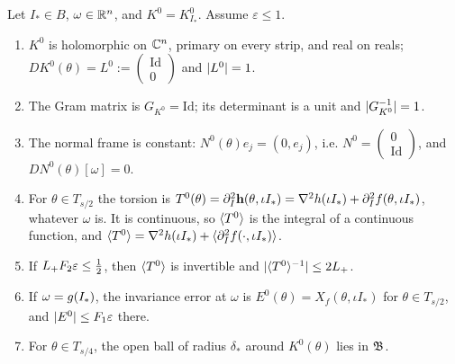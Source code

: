 \begin{lemma}\label{bp:p4:unperturbed}
Let $I_*\in B$, $\omega\in\mathbb{R}^n$, and $K^0=K^0_{I_*}$. Assume $\varepsilon\le1$.
\begin{enumerate}[label=(\alph*)]
\item $K^0$ is holomorphic on $\mathbb{C}^n$, primary on every strip, and real on reals;
  $DK^0(\theta)=L^0:=\left(\begin{smallmatrix}\mathrm{Id}\\0\end{smallmatrix}\right)$ and $\lvert L^0\rvert=1$.
\item The Gram matrix is $G_{K^0}=\mathrm{Id}$; its determinant is a unit and
  $\lvert G_{K^0}^{-1}\rvert=1$.
\item The normal frame is constant: $N^0(\theta)e_j=(0,e_j)$, i.e.
  $N^0=\left(\begin{smallmatrix}0\\\mathrm{Id}\end{smallmatrix}\right)$, and $DN^0(\theta)[\omega]=0$.
\item For $\theta\in T_{s/2}$ the torsion is
  $T^0(\theta)=\partial_I^2\mathbf{h}(\theta,\iota I_*)=\nabla^2h(\iota I_*)+\partial_I^2f(\theta,\iota I_*)$,
  whatever $\omega$ is. It is continuous, so $\langle T^0\rangle$ is the integral of a continuous function,
  and $\langle T^0\rangle=\nabla^2h(\iota I_*)+\langle \partial_I^2f(\cdot,\iota I_*)\rangle$.
\item If $L_{+} F_2\varepsilon\le\frac12$, then $\langle T^0\rangle$ is invertible and
  $\lvert \langle T^0\rangle^{-1}\rvert\le2L_{+}$.
\item If $\omega=g(I_*)$, the invariance error at $\omega$ is $E^0(\theta)=X_f(\theta,\iota I_*)$
  for $\theta\in T_{s/2}$, and $\lvert E^0\rvert\le F_1\varepsilon$ there.
\item For $\theta\in T_{s/4}$, the open ball of radius $\delta_*$ around $K^0(\theta)$ lies in
  $\mathfrak{B}$.
\end{enumerate}
\end{lemma}

